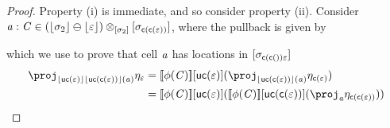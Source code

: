 \begin{proof}
    Property (i) is immediate, and so consider property (ii).
    Consider $\mathit{a} : \mathit{C} \in (\lfloor\sigma_2\rfloor \ominus \lfloor\varepsilon\rfloor) \otimes_{[\sigma_2]} [\sigma_{\mathsf{c}(\mathsf{c}(\varepsilon))}]$,
    where the pullback is given by
    \begin{center}
    \end{center}
    which we use to prove that cell $\mathit{a}$ has locations in $[\sigma_{\mathsf{c}(\mathsf{c}())\varepsilon}]$
    \begin{align*}
        \proj_{\concL{\uncon\me}\concL{\uncon{\con\me}}(\va)} \mvarM_\me
            & = \sem{\phi(\vC)}\anyL{\uncon\me}(\proj_{\concL{\uncon{\con\me}}(\va)} \mvarM_{\con\me}) \\
            & = \sem{\phi(\vC)}\anyL{\uncon\me}(\sem{\phi(\vC)}\anyL{\uncon{\con\me}}(\proj_{\va} \mvarM_{\con{\con\me}}))
    \end{align*}
\end{proof}

